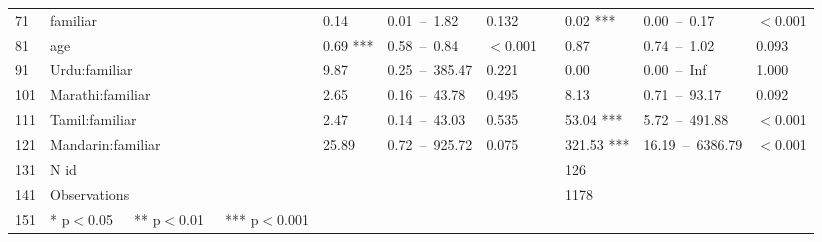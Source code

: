 \begin{table}[ht]
\begin{tabular}{}
  71 & familiar & 0.14 & 0.01 – 1.82 & 0.132 &  & 0.02 *** & 0.00 – 0.17 & $<$0.001 \\ 
  81 & age & 0.69 *** & 0.58 – 0.84 & $<$0.001 &  & 0.87 & 0.74 – 1.02 & 0.093 \\ 
  91 & Urdu:familiar & 9.87 & 0.25 – 385.47 & 0.221 &  & 0.00 & 0.00 – Inf & 1.000 \\ 
  101 & Marathi:familiar & 2.65 & 0.16 – 43.78 & 0.495 &  & 8.13 & 0.71 – 93.17 & 0.092 \\ 
  111 & Tamil:familiar & 2.47 & 0.14 – 43.03 & 0.535 &  & 53.04 *** & 5.72 – 491.88 & $<$0.001 \\ 
  121 & Mandarin:familiar & 25.89 & 0.72 – 925.72 & 0.075 &  & 321.53 *** & 16.19 – 6386.79 & $<$0.001 \\ 
  131 & N id &  &  &  &  & 126 &  &  \\ 
  141 & Observations &  &  &  &  & 1178 &  &  \\ 
  151 & * p$<$0.05   ** p$<$0.01   *** p$<$0.001 &  &  &  &  &  &  &  \\ 
   \hline
\end{tabular}
\end{table}
